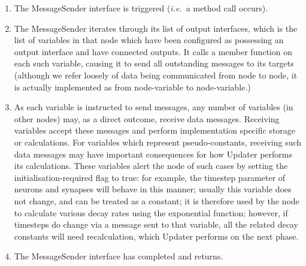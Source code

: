 \documentclass[pdftex,a4paper]{article}
\newcommand{\ie}{{\em i.e.\ }}
\begin{document}
\begin{itemize}
\begin{enumerate}
    \item The MessageSender interface is triggered (\ie a method call
    occurs).

    \item The MessageSender iterates through its list of output
    interfaces, which is the list of variables in that node which have
    been configured as possessing an output interface and have
    connected outputs. It calls a member function on each such
    variable, causing it to send all outstanding messages to its
    targets (although we refer loosely of data being communicated from
    node to node, it is actually implemented as from node-variable to
    node-variable.)

    \item As each variable is instructed to send messages, any number
    of variables (in other nodes) may, as a direct outcome, receive
    data messages. Receiving variables accept these messages and
    perform implementation specific storage or calculations. For
    variables which represent pseudo-constants, receiving such data
    messages may have important consequences for how Updater performs
    its calculations. These variables alert the node of such cases by
    setting the initialisation-required flag to true: for example, the
    timestep parameter of neurons and synapses will behave in this
    manner; usually this variable does not change, and can be treated
    as a constant; it is therefore used by the node to calculate
    various decay rates using the exponential function; however, if
    timesteps do change via a message sent to that variable, all the
    related decay constants will need recalculation, which Updater
    performs on the next phase.

    \item The MessageSender interface has completed and returns.

  \end{enumerate}

\end{itemize}
\end{document}
